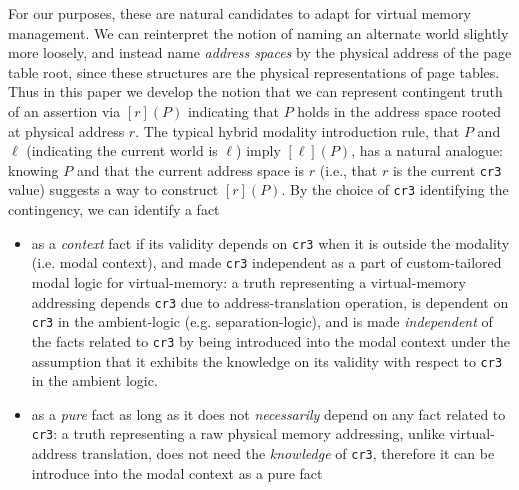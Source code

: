 For our purposes, these are natural candidates to adapt for virtual memory management. We can reinterpret the notion of 
naming an alternate world slightly more loosely, and instead name \emph{address spaces} by the physical address of the 
page table root, since these structures are the physical representations of page tables. Thus in this paper we develop 
the notion that we can represent contingent truth of an assertion via $[r](P)$ indicating that $P$ holds in the address 
space rooted at physical address $r$.
The typical hybrid modality introduction rule, that $P$ and $\ell$ (indicating the current world is $\ell$) imply 
$[\ell](P)$, has a natural analogue: knowing $P$ and that the current address space is $r$ (i.e., that $r$ is the 
current \texttt{cr3} value) suggests a way to construct $[r](P)$. By the choice of \texttt{cr3} identifying the contingency, we can identify a fact
\begin{itemize}
  \item as a \textit{context} fact if its validity depends on \texttt{cr3} when it is outside the modality (i.e. modal context), and made \texttt{cr3} independent as a part of custom-tailored modal logic for virtual-memory: a truth representing a virtual-memory addressing depends \texttt{cr3} due to address-translation operation, is dependent on \texttt{cr3} in the ambient-logic (e.g. separation-logic), and is made \textit{independent} of the facts related to \texttt{cr3} by being introduced into the modal context under the assumption that it exhibits the knowledge on its validity with respect to \texttt{cr3} in the ambient logic.
  \item as a \textit{pure} fact as long as it does not \textit{necessarily} depend on any fact related to \texttt{cr3}: a truth representing a raw physical memory addressing, unlike virtual-address translation, does not need the \textit{knowledge} of \texttt{cr3}, therefore it can be introduce into the modal context as a pure fact
\end{itemize}

